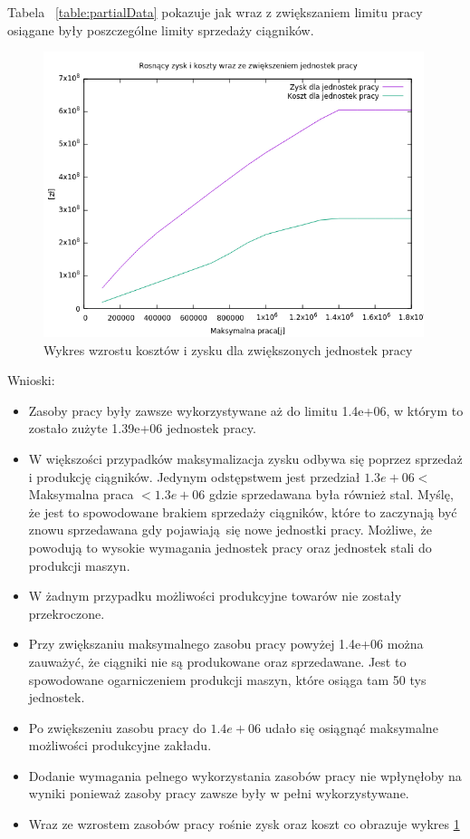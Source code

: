 \documentclass{article}
\begin{document}
Tabela ~\ref{table:partialData} pokazuje jak wraz z zwiększaniem limitu pracy osiągane były poszczególne limity sprzedaży ciągników.

\begin{figure}[H]
  \caption{\label{fig:chart}Wykres wzrostu kosztów i zysku dla zwiększonych jednostek pracy }
  \includegraphics[width=0.99\textwidth]{output/chart.png} %
\end{figure}

Wnioski:

\begin{itemize}
    \item Zasoby pracy były zawsze wykorzystywane aż do limitu 1.4e+06, w którym to zostało zużyte 1.39e+06 jednostek pracy. 
    \item W większości przypadków maksymalizacja zysku odbywa się poprzez sprzedaż i produkcję ciągników. Jedynym odstępstwem jest przedział $1.3e+06 < $ Maksymalna praca $ < 1.3e+06$ gdzie sprzedawana była również stal. 
      Myślę, że jest to spowodowane brakiem sprzedaży ciągników, które to zaczynają być znowu sprzedawana gdy pojawiają się nowe jednostki pracy. Możliwe, że powodują to wysokie wymagania jednostek pracy oraz jednostek stali do produkcji maszyn. 
    \item W żadnym przypadku możliwości produkcyjne towarów nie zostały przekroczone.
    \item Przy zwiększaniu maksymalnego zasobu pracy powyżej 1.4e+06 można zauważyć, że ciągniki nie są produkowane oraz sprzedawane. Jest to spowodowane ogarniczeniem produkcji maszyn, które osiąga tam 50 tys jednostek.
    \item Po zwiększeniu zasobu pracy do $1.4e+06$ udało się osiągnąć maksymalne możliwości produkcyjne zakładu.
    \item Dodanie wymagania pelnego wykorzystania zasobów pracy nie wpłynęłoby na wyniki ponieważ zasoby pracy zawsze były w pełni wykorzystywane.
    \item Wraz ze wzrostem zasobów pracy rośnie zysk oraz koszt co obrazuje wykres \ref{fig:chart}
\end{itemize}
\end{document}
